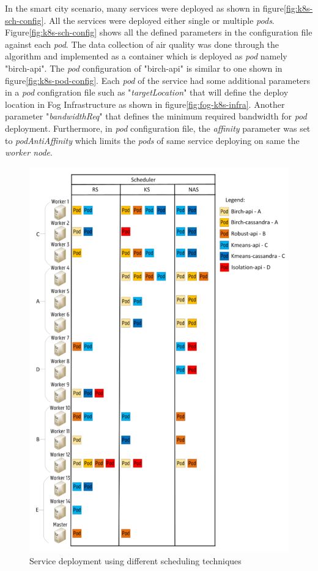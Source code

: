 In the smart city scenario, many services were deployed as shown in figure\ref{fig:k8s-sch-config}. All the services were deployed either single or multiple \emph{pods}. Figure\ref{fig:k8s-sch-config} shows all the defined parameters in the configuration file against each \emph{pod}. The data collection of air quality was done through the algorithm and implemented as a container which is deployed as \emph{pod} namely "birch-api"\cite{Santos2019}. The \emph{pod} configuration of "birch-api" is similar to one shown in figure\ref{fig:k8s-pod-config}. Each \emph{pod} of the service  had some additional parameters in a \emph{pod} configration file such as "\emph{targetLocation}" that will define the deploy location in Fog Infrastructure as shown in figure\ref{fig:fog-k8s-infra}. Another parameter "\emph{bandwidthReq}" that defines the minimum required bandwidth for \emph{pod} deployment. Furthermore, in \emph{pod} configuration file, the \emph{affinity} parameter was set to \emph{podAntiAffinity} which limits the \emph{pods} of same service deploying on same the \emph{worker node}\cite{Santos2019}.
\begin{figure}
  \centering
  \includegraphics[width=\linewidth]{figures/mlcn-k8s-service-prov.pdf}
  \caption{Service deployment using different scheduling techniques\cite{Santos2019}}
  \label{fig:k8s-service}
\end{figure}
